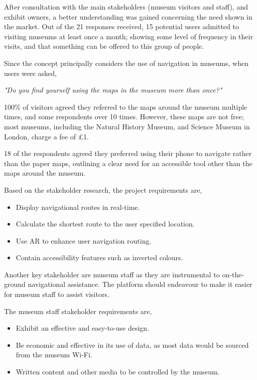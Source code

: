 
After consultation with the main stakeholders (museum visitors and staff), and exhibit owners, a better understanding was gained concerning the need shown in the market. Out of the 21 responses received, 15 potential users admitted to visiting museums at least once a month; showing some level of frequency in their visits, and that something can be offered to this group of people.

Since the concept principally considers the use of navigation in museums, when users were asked, 

\begin{displayquote}
\textit{"Do you find yourself using the maps in the museum more than once?"}
\end{displayquote}

100\% of visitors agreed they referred to the maps around the museum multiple times, and some respondents over 10 times. However, these maps are not free; most museums, including the Natural History Museum, and Science Museum in London, charge a fee of £1.

18 of the respondents agreed they preferred using their phone to navigate rather than the paper maps, outlining a clear need for an accessible tool other than the maps around the museum.

Based on the stakeholder research, the project requirements are, 
\begin{itemize}
    \item Display navigational routes in real-time.
    \item Calculate the shortest route to the user specified location.
    \item Use AR to enhance user navigation routing.
    \item Contain accessibility features such as inverted colours.
\end{itemize}

Another key stakeholder are museum staff as they are instrumental to on-the-ground navigational assistance. The platform should endeavour to make it easier for museum staff to assist visitors.

The museum staff stakeholder requirements are,
\begin{itemize}
    \item Exhibit an effective and easy-to-use design. 
    \item Be economic and effective in its use of data, as most data would be sourced from the museum Wi-Fi. 
    \item Written content and other media to be controlled by the museum.
\end{itemize}

